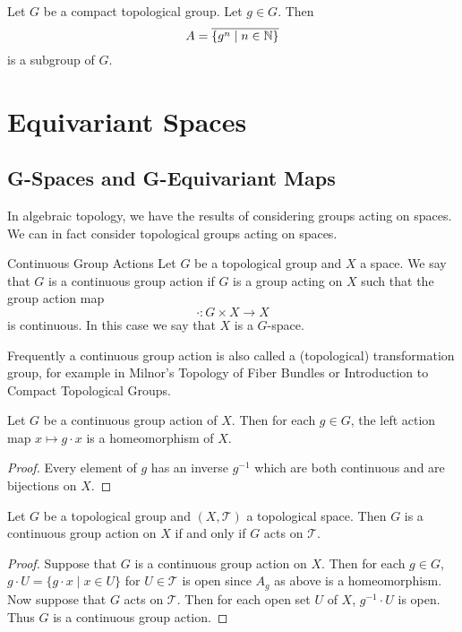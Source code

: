 \documentclass[a4paper]{article}
\begin{document}
\begin{prp}{}{} Let $G$ be a compact topological group. Let $g\in G$. Then $$A=\overline{\{g^n\;|\;n\in\mathbb{N}\}}$$ is a subgroup of $G$. 
\end{prp}

\pagebreak
\section{Equivariant Spaces}
\subsection{G-Spaces and G-Equivariant Maps}
In algebraic topology, we have the results of considering groups acting on spaces. We can in fact consider topological groups acting on spaces. 

\begin{defn}{Continuous Group Actions}{} Let $G$ be a topological group and $X$ a space. We say that $G$ is a continuous group action if $G$ is a group acting on $X$ such that the group action map $$\cdot:G\times X\to X$$ is continuous. In this case we say that $X$ is a $G$-space. 
\end{defn}

Frequently a continuous group action is also called a (topological) transformation group, for example in Milnor's Topology of Fiber Bundles or Introduction to Compact Topological Groups. 

\begin{prp}{}{} Let $G$ be a continuous group action of $X$. Then for each $g\in G$, the left action map $x\mapsto g\cdot x$ is a homeomorphism of $X$. \tcbline
\begin{proof}
Every element of $g$ has an inverse $g^{-1}$ which are both continuous and are bijections on $X$. 
\end{proof}
\end{prp}

\begin{prp}{}{} Let $G$ be a topological group and $(X,\mathcal{T})$ a topological space. Then $G$ is a continuous group action on $X$ if and only if $G$ acts on $\mathcal{T}$. \tcbline
\begin{proof}
Suppose that $G$ is a continuous group action on $X$. Then for each $g\in G$, $g\cdot U=\{g\cdot x\;|\; x\in U\}$ for $U\in\mathcal{T}$ is open since $A_g$ as above is a homeomorphism. Now suppose that $G$ acts on $\mathcal{T}$. Then for each open set $U$ of $X$, $g^{-1}\cdot U$ is open. Thus $G$ is a continuous group action. 
\end{proof}
\end{prp}
\end{document}
